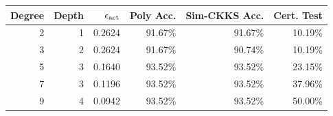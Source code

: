 \begin{tabular}{rrrrrr}
\toprule
Degree & Depth & $\epsilon_{\rm act}$ & Poly Acc. & Sim-CKKS Acc. & Cert. Test \\
\midrule
2 & 1 & 0.2624 & 91.67\% & 91.67\% & 10.19\% \\
3 & 2 & 0.2624 & 91.67\% & 90.74\% & 10.19\% \\
5 & 3 & 0.1640 & 93.52\% & 93.52\% & 23.15\% \\
7 & 3 & 0.1196 & 93.52\% & 93.52\% & 37.96\% \\
9 & 4 & 0.0942 & 93.52\% & 93.52\% & 50.00\% \\
\bottomrule
\end{tabular}
